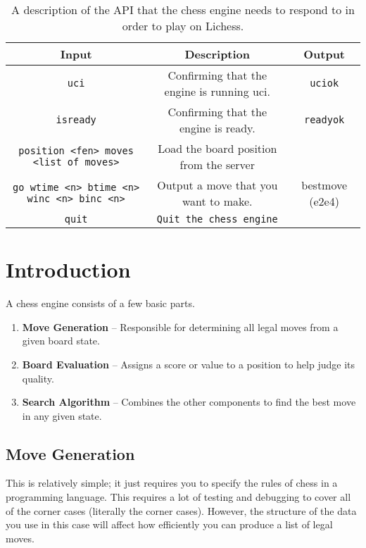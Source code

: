 \documentclass[sigconf]{acmart}
\begin{document}
\begin{table*}[h]
    \centering
    \renewcommand{\arraystretch}{1.2}
    \setlength{\tabcolsep}{8pt}
    \begin{tabular}{|c|c|c|}
        \hline
        \textbf{Input} & \textbf{Description} & \textbf{Output} \\
        \hline
        \texttt{uci} & Confirming that the engine is running uci. & \texttt{uciok} \\
        \hline
        \texttt{isready} & Confirming that the engine is ready. & \texttt{readyok} \\
        \hline
        \texttt{position <fen> moves <list of moves>} & Load the board position from the server & \\
        \hline
        \texttt{go wtime <n> btime <n> winc <n> binc <n>} & Output a move that you want to make. & bestmove (e2e4) \\
        \hline
        \texttt{quit} & \texttt{Quit the chess engine} & \\
        \hline
    \end{tabular}
    \caption{A description of the API that the chess engine needs to respond to in order to play on Lichess.}
    \label{tab:api}
\end{table*}

\section{Introduction}
A chess engine consists of a few basic parts.
\begin{enumerate}
    \item \textbf{Move Generation} – Responsible for determining all legal moves from a given board state.
    \item \textbf{Board Evaluation} – Assigns a score or value to a position to help judge its quality.
    \item \textbf{Search Algorithm} – Combines the other components to find the best move in any given state.
\end{enumerate}

\subsection{Move Generation}
This is relatively simple; it just requires you to specify the rules of chess in a programming language. This requires a lot of testing and debugging to cover all of the corner cases (literally the corner cases).
However, the structure of the data you use in this case will affect how efficiently you can produce a list of legal moves.
\end{document}
